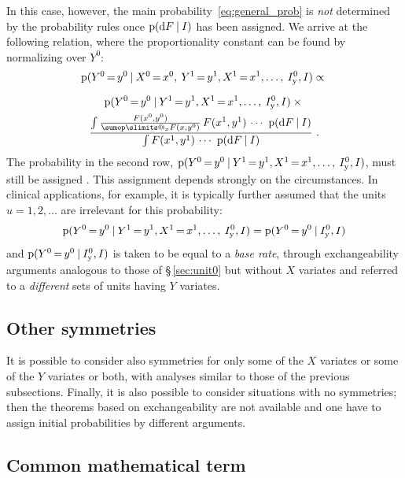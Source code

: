 \documentclass[\ifafour a4paper,12pt,\else a5paper,10pt,\fi%
onecolumn,oneside,article,%
british%
]{memoir}
\makeatletter
\theoremstyle{remark}
\theoremstyle{innote}
\def\sum{\DOTSI\sumop\slimits@}
\newcommand*{\di}{\mathrm{d}}%
\newcommand*{\p}{\mathrm{p}}%
\renewcommand*{\|}[1][]{\nonscript\:#1\vert\nonscript\:\mathopen{}}
\newcommand*{\mo}[1][=]{\mathord{\,#1\,}}
\newcommand*{\sect}{\S}%
\newcommand*{\Iy}{I_{\textrm{y}}}
\makeatother
\begin{document}
  In this case, however, the main probability~\eqref{eq:general_prob} is \emph{not} determined by the probability rules once $\p(\di F\|I)$ has been assigned. We arrive at the following relation, where the proportionality constant can be found by normalizing over $Y^{0}$:
\begin{multline}
  \label{eq:relation_exchY}
  \p(Y^{0}\mo y^{0} \|
  X^{0}\mo x^{0},\: Y^{1}\mo y^{1},X^{1}\mo x^{1},\dotsc,\: \Iy^{0},I)
  \propto
{}\\[2\jot]
  \p(Y^{0}\mo y^{0} \|
  Y^{1}\mo y^{1},X^{1}\mo x^{1},\dotsc,\: \Iy^{0},I) \times{}\\
  \frac{
    \int \frac{F(x^{0},y^{0})}{\sum_{x}F(x,y^{0})}\, F(x^{1},y^{1})\,\dotsm\  \p(\di F \|I)
  }{
    \int F(x^{1},y^{1})\,\dotsm\  \p(\di F \|I)
  } \ .
\end{multline}
The probability in the second row, $\p(Y^{0}\mo y^{0} \| Y^{1}\mo y^{1},X^{1}\mo x^{1},\dotsc,\: \Iy^{0},I)$, must still be assigned \autocites{lindleyetal1981}. This assignment depends strongly on the circumstances. In clinical applications, for example, it is typically further assumed that the units $u=1,2,\dotsc$ are irrelevant for this probability:
\begin{equation}
  \label{eq:indepYfromdata}
    \p(Y^{0}\mo y^{0} \|
  Y^{1}\mo y^{1},X^{1}\mo x^{1},\dotsc,\: \Iy^{0},I) =
    \p(Y^{0}\mo y^{0} \| \Iy^{0},I)
\end{equation}
and $\p(Y^{0}\mo y^{0} \| \Iy^{0},I)$ is taken to be equal to a \emph{base rate}\autocites{barhillel1980,jennyetal2018,sprengeretal2021,matthews1996}, through exchangeability arguments analogous to those of \sect\,\ref{sec:unit0} but without $X$ variates and referred to a \emph{different} sets of units having $Y$ variates.

\subsection{Other symmetries}
\label{sec:other_symm}

It is possible to consider also symmetries for only some of the $X$ variates or some of the $Y$ variates or both, with analyses similar to those of the previous subsections. Finally, it is also possible to consider situations with no symmetries; then the theorems based on exchangeability are not available and one have to assign initial probabilities by different arguments.

\subsection{Common mathematical term}
\label{sec:common_term}
\end{document}
